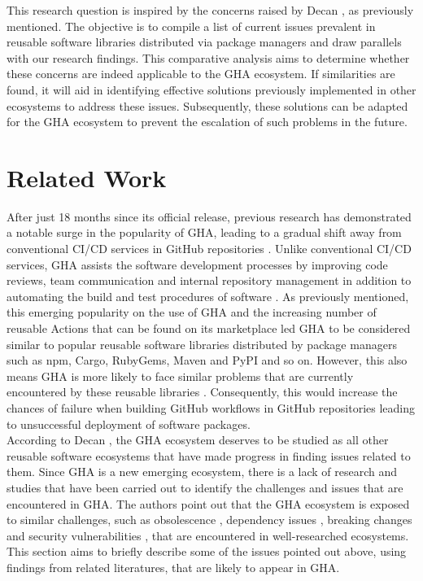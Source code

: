 \documentclass[conference]{IEEEtran}
\begin{document}
    This research question is inspired by the concerns raised by Decan \cite{decan2022use}, as previously mentioned. The objective is to compile a list of current issues prevalent in reusable software libraries distributed via package managers and draw parallels with our research findings. This comparative analysis aims to determine whether these concerns are indeed applicable to the GHA ecosystem. If similarities are found, it will aid in identifying effective solutions previously implemented in other ecosystems to address these issues. Subsequently, these solutions can be adapted for the GHA ecosystem to prevent the escalation of such problems in the future.




\section{Related Work}
    After just 18 months since its official release, previous research has demonstrated a notable surge in the popularity of GHA, leading to a gradual shift away from conventional CI/CD services in GitHub repositories \cite{golzadeh2021rise}. Unlike conventional CI/CD services, GHA assists the software development processes by improving code reviews, team communication and internal repository management in addition to automating the build and test procedures of software \cite{chandrasekara2021hands}. As previously mentioned, this emerging popularity on the use of GHA and the increasing number of reusable Actions that can be found on its marketplace led GHA to be considered similar to popular reusable software libraries distributed by package managers such as npm, Cargo, RubyGems, Maven and PyPI and so on. However, this also means GHA is more likely to face similar problems that are currently encountered by these reusable libraries \cite{decan2022use}. Consequently, this would increase the chances of failure when building GitHub workflows in GitHub repositories leading to unsuccessful deployment of software packages. \\
    According to Decan \cite{decan2022use}, the GHA ecosystem deserves to be studied as all other reusable software ecosystems that have made progress in finding issues related to them. Since GHA is a new emerging ecosystem, there is a lack of research and studies that have been carried out to identify the challenges and issues that are encountered in GHA. The authors point out that the GHA ecosystem is exposed to similar challenges, such as obsolescence \cite{decan2018evolution} \cite{cogo2021deprecation}, dependency issues \cite{decan2019empirical} \cite{soto2021comprehensive} \cite{decan2019package}, breaking changes \cite{dietrich2019dependency}\cite{decan2018impact} and security vulnerabilities \cite{zimmermann2019small} \cite{kula2018developers}, that are encountered in well-researched ecosystems. This section aims to briefly describe some of the issues pointed out above, using findings from related literatures, that are likely to appear in GHA.
\end{document}
